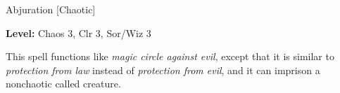 
Abjuration [Chaotic]

\textbf{Level:} Chaos 3, Clr 3, Sor/Wiz 3

This spell functions like \textit{magic circle against evil}, except that it is 
similar to \textit{protection from law} instead of \textit{protection from evil}, 
and it can imprison a nonchaotic called creature.

